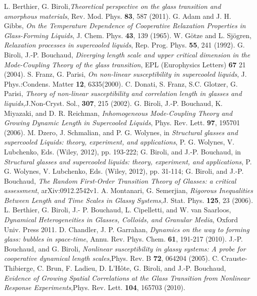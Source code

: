 \documentclass[single column,pre]{revtex4}
\begin{document}
 
\begin{thebibliography}{99}
 L. Berthier, G. Biroli,\textit{Theoretical perspective on the glass transition and amorphous materials}, Rev. Mod. Phys. {\bf 83}, 587 (2011).
 G. Adam and J. H. Gibbs, \textit{On the Temperature Dependence of Cooperative Relaxation Properties in
Glass-Forming Liquids}, J. Chem. Phys. {\bf 43}, 139 (1965).
 W. G\"otze and L. Sj\"ogren, \textit{Relaxation processes in supercooled liquids}, Rep. Prog. Phys. {\bf 55}, 241 (1992).
 G. Biroli, J.-P. Bouchaud, \textit{Diverging length scale and upper critical dimension in the Mode-Coupling Theory of the glass transition}, EPL (Europhysics Letters) {\bf 67} 21 (2004).
 S. Franz, G. Parisi, \textit{On non-linear susceptibility in supercooled liquids}, J. Phys.:Condens. Matter {\bf 12}, 6335(2000). C. Donati, S. Franz, S.C. Glotzer, G. Parisi, \textit{Theory of non-linear susceptibility and correlation length in glasses and liquids},J.Non-Cryst. Sol., {\bf 307}, 215 (2002).
 G. Biroli, J.-P. Bouchaud, K. Miyazaki, and D. R. Reichman, \textit{Inhomogeneous Mode-Coupling Theory and Growing Dynamic Length in Supercooled Liquids}, Phys. Rev. Lett. {\bf 97}, 195701 (2006).
 M. Dzero, J. Schmalian, and P. G. Wolynes, in {\it Structural glasses and supercooled Liquids: theory, experiment, and applications}, P. G. Wolynes, V. Lubchenko, Eds. (Wiley,  2012), pp. 193-222;  G. Biroli, and J.-P. Bouchaud, in {\it Structural glasses and supercooled liquids: theory, experiment, and applications},  P. G. Wolynes, V. Lubchenko, Eds. (Wiley, 2012), pp. 31-114; G. Biroli, and J.-P. Bouchaud, \textit{The Random First-Order Transition Theory of Glasses: a critical assessment}, arXiv:0912.2542v1.
 A. Montanari, G. Semerjian, \textit{Rigorous Inequalities Between Length and Time Scales in Glassy Systems},J. Stat. Phys. {\bf 125}, 23 (2006). 
  L. Berthier, G. Biroli, J.- P. Bouchaud, L. Cipelletti, and W. van Saarloos,
{\it Dynamical Heterogeneities in Glasses, Colloids, and Granular Media}, Oxford Univ. Press 2011.
 D. Chandler, J. P. Garrahan, \textit{Dynamics on the way to forming glass: bubbles in space-time},  Annu. Rev. Phys. Chem. {\bf 61}, 191-217 (2010).
 J.-P. Bouchaud, and G. Biroli, \textit{Nonlinear susceptibility in glassy systems: A probe for cooperative dynamical length scales},Phys. Rev. B {\bf 72}, 064204 (2005).
 C. Crauste-Thibierge, C. Brun, F. Ladieu, D. L'H\^ote, G. Biroli, and J.-P. Bouchaud, \textit{Evidence of Growing Spatial Correlations at the Glass Transition from Nonlinear Response Experiments},Phys. Rev. Lett. {\bf 104}, 165703 (2010).

\end{thebibliography}
\end{document}
